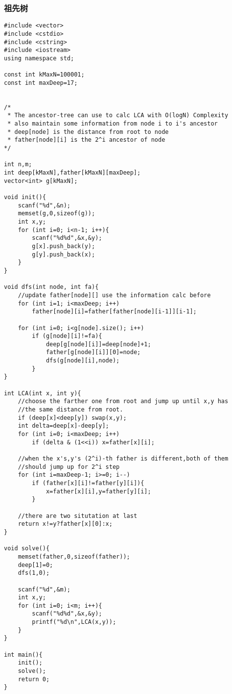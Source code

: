 \subsubsection{祖先树}
\begin{verbatim}
#include <vector>
#include <cstdio>
#include <cstring>
#include <iostream>
using namespace std;

const int kMaxN=100001;
const int maxDeep=17;


/*
 * The ancestor-tree can use to calc LCA with O(logN) Complexity
 * also maintain some information from node i to i's ancestor
 * deep[node] is the distance from root to node
 * father[node][i] is the 2^i ancestor of node
*/

int n,m;
int deep[kMaxN],father[kMaxN][maxDeep];
vector<int> g[kMaxN];

void init(){
    scanf("%d",&n);
    memset(g,0,sizeof(g));
    int x,y;
    for (int i=0; i<n-1; i++){
        scanf("%d%d",&x,&y);
        g[x].push_back(y);
        g[y].push_back(x);
    }
}

void dfs(int node, int fa){
    //update father[node][] use the information calc before
    for (int i=1; i<maxDeep; i++) 
        father[node][i]=father[father[node][i-1]][i-1];

    for (int i=0; i<g[node].size(); i++)
        if (g[node][i]!=fa){
            deep[g[node][i]]=deep[node]+1;
            father[g[node][i]][0]=node;
            dfs(g[node][i],node);
        }
}

int LCA(int x, int y){
    //choose the farther one from root and jump up until x,y has 
    //the same distance from root.
    if (deep[x]<deep[y]) swap(x,y);
    int delta=deep[x]-deep[y];
    for (int i=0; i<maxDeep; i++)
        if (delta & (1<<i)) x=father[x][i];

    //when the x's,y's (2^i)-th father is different,both of them
    //should jump up for 2^i step
    for (int i=maxDeep-1; i>=0; i--)
        if (father[x][i]!=father[y][i]){
            x=father[x][i],y=father[y][i];
        }

    //there are two situtation at last
    return x!=y?father[x][0]:x;
}

void solve(){
    memset(father,0,sizeof(father));
    deep[1]=0;
    dfs(1,0);

    scanf("%d",&m);
    int x,y;
    for (int i=0; i<m; i++){
        scanf("%d%d",&x,&y);
        printf("%d\n",LCA(x,y));
    }
}

int main(){
    init();
    solve();
    return 0;
}
\end{verbatim}
